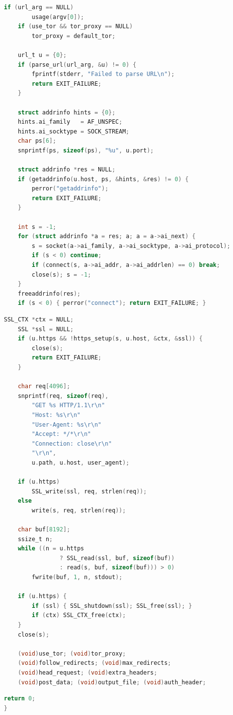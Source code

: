 \begin{lstlisting}[style=oldcode,language=C,firstnumber=last]
    if (url_arg == NULL)
        usage(argv[0]);
    if (use_tor && tor_proxy == NULL)
        tor_proxy = default_tor;

    url_t u = {0};
    if (parse_url(url_arg, &u) != 0) {
        fprintf(stderr, "Failed to parse URL\n");
        return EXIT_FAILURE;
    }

    struct addrinfo hints = {0};
    hints.ai_family   = AF_UNSPEC;
    hints.ai_socktype = SOCK_STREAM;
    char ps[6];
    snprintf(ps, sizeof(ps), "%u", u.port);

    struct addrinfo *res = NULL;
    if (getaddrinfo(u.host, ps, &hints, &res) != 0) {
        perror("getaddrinfo");
        return EXIT_FAILURE;
    }

    int s = -1;
    for (struct addrinfo *a = res; a; a = a->ai_next) {
        s = socket(a->ai_family, a->ai_socktype, a->ai_protocol);
        if (s < 0) continue;
        if (connect(s, a->ai_addr, a->ai_addrlen) == 0) break;
        close(s); s = -1;
    }
    freeaddrinfo(res);
    if (s < 0) { perror("connect"); return EXIT_FAILURE; }
\end{lstlisting}
\begin{lstlisting}[style=newcode,language=C,firstnumber=last]
    SSL_CTX *ctx = NULL;
    SSL *ssl = NULL;
    if (u.https && !https_setup(s, u.host, &ctx, &ssl)) {
        close(s);
        return EXIT_FAILURE;
    }

    char req[4096];
    snprintf(req, sizeof(req),
        "GET %s HTTP/1.1\r\n"
        "Host: %s\r\n"
        "User-Agent: %s\r\n"
        "Accept: */*\r\n"
        "Connection: close\r\n"
        "\r\n",
        u.path, u.host, user_agent);

    if (u.https)
        SSL_write(ssl, req, strlen(req));
    else
        write(s, req, strlen(req));

    char buf[8192];
    ssize_t n;
    while ((n = u.https
                ? SSL_read(ssl, buf, sizeof(buf))
                : read(s, buf, sizeof(buf))) > 0)
        fwrite(buf, 1, n, stdout);

    if (u.https) {
        if (ssl) { SSL_shutdown(ssl); SSL_free(ssl); }
        if (ctx) SSL_CTX_free(ctx);
    }
    close(s);

    (void)use_tor; (void)tor_proxy;
    (void)follow_redirects; (void)max_redirects;
    (void)head_request; (void)extra_headers;
    (void)post_data; (void)output_file; (void)auth_header;
\end{lstlisting}
\begin{lstlisting}[style=oldcode,language=C,firstnumber=last]
    return 0;
}
\end{lstlisting}
\FullSourceStop
